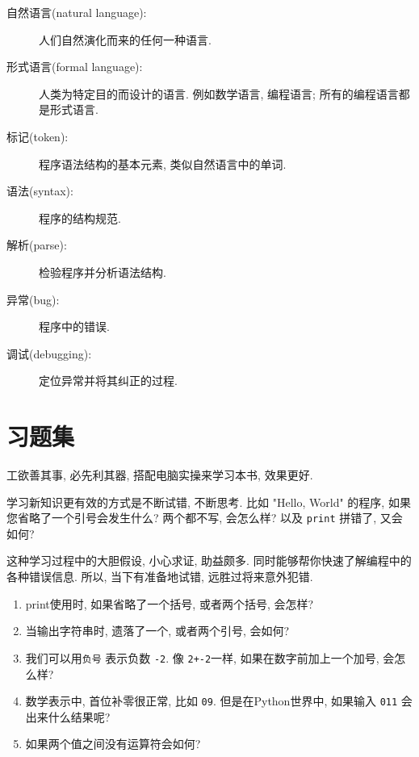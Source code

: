 \documentclass[10pt]{book}
\begin{document}
\begin{description}
\item[自然语言(natural language):] 人们自然演化而来的任何一种语言. 

\item[形式语言(formal language):] 人类为特定目的而设计的语言. 
例如数学语言, 编程语言; 所有的编程语言都是形式语言. 

\item[标记(token):] 程序语法结构的基本元素, 类似自然语言中的单词. 

\item[语法(syntax):] 程序的结构规范. 

\item[解析(parse):] 检验程序并分析语法结构. 

\item[异常(bug):] 程序中的错误. 

\item[调试(debugging):] 定位异常并将其纠正的过程. 

\end{description}


\section{习题集}

\begin{exercise}

工欲善其事, 必先利其器, 搭配电脑实操来学习本书, 效果更好. 

学习新知识更有效的方式是不断试错, 不断思考. 比如 "Hello, World" 的程序, 
如果您省略了一个引号会发生什么?
两个都不写, 会怎么样?
以及 {\tt print} 拼错了, 又会如何?

这种学习过程中的大胆假设, 小心求证, 助益颇多. 
同时能够帮你快速了解编程中的各种错误信息. 
所以, 当下有准备地试错, 远胜过将来意外犯错. 

\begin{enumerate}

\item print使用时, 如果省略了一个括号, 或者两个括号, 会怎样?

\item 当输出字符串时, 遗落了一个, 或者两个引号, 会如何? 

\item 我们可以用{\tt 负号} 表示负数 {\tt -2}. 
像 {\tt 2+-2}一样, 如果在数字前加上一个加号, 会怎么样? 


\item 数学表示中, 首位补零很正常, 比如 {\tt09}. 
但是在Python世界中, 如果输入 {\tt 011} 会出来什么结果呢?

\item 如果两个值之间没有运算符会如何? 

\end{enumerate}

\end{exercise}
\end{document}
